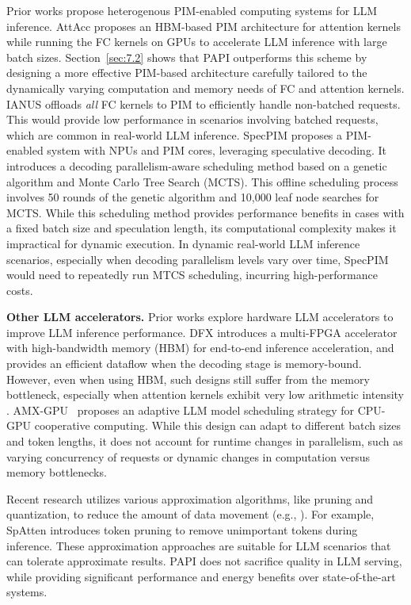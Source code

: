 Prior works propose heterogenous PIM-enabled computing systems for LLM inference. 
AttAcc \cite{park2024attacc} proposes an HBM-based PIM architecture for attention kernels while running the FC kernels on GPUs to accelerate LLM inference with large batch sizes. Section~\ref{sec:7.2} shows that PAPI outperforms this scheme by designing a more effective PIM-based architecture carefully tailored to the dynamically varying computation and memory needs of FC and attention kernels.
IANUS \cite{seo2024ianus} offloads \emph{all} FC kernels to PIM to efficiently handle non-batched requests.
This would provide low performance in scenarios involving batched requests, which are common in real-world LLM inference.
SpecPIM \cite{li2024specpim} proposes a PIM-enabled system with NPUs and PIM cores, leveraging speculative decoding. It introduces a decoding parallelism-aware scheduling method based on a genetic algorithm and Monte Carlo Tree Search (MCTS). This offline scheduling process involves 50 rounds of the genetic algorithm and 10,000 leaf node searches for MCTS.
While this scheduling method provides performance benefits in cases with a fixed batch size and speculation length, its computational complexity makes it impractical for dynamic execution. In dynamic real-world LLM inference scenarios, especially when decoding parallelism levels vary over time, SpecPIM would need to repeatedly run MTCS scheduling, incurring high-performance costs.



\noindent\textbf{Other LLM accelerators.}
Prior works explore hardware LLM accelerators to improve LLM inference performance.
DFX \cite{hong2022dfx} introduces a multi-FPGA accelerator with high-bandwidth memory (HBM) for end-to-end inference acceleration, and provides an efficient dataflow when the decoding stage is memory-bound. 
However, even when using HBM, such designs still suffer from the memory bottleneck, especially when attention kernels exhibit very low arithmetic intensity \cite{xia2023flashllm}. 
AMX-GPU~\cite{kim2024exploiting} proposes an adaptive LLM model scheduling strategy for CPU-GPU cooperative computing. While this design can adapt to different batch sizes and token lengths, it does not account for runtime changes in parallelism, such as varying concurrency of requests or dynamic changes in computation versus memory bottlenecks.

Recent research utilizes various approximation algorithms, like pruning and quantization, to reduce the amount of data movement (e.g., \cite{wang2023cta, qu2022dota, kao2023flat, ham20203, dong2023heatvit, dass2023vitality, you2023vitcod, ham2021elsa, guo2023olive, lu2021sanger}).
For example, SpAtten \cite{wang2021spatten} introduces token pruning to remove unimportant tokens during inference.
These approximation approaches are suitable for LLM scenarios that can tolerate approximate results. PAPI does not sacrifice quality in LLM serving, while providing significant performance and energy benefits over state-of-the-art systems.

